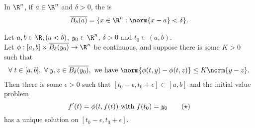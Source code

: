 \begin{definition}
    In $\R^n$, if $a\in \R^n$ and $\delta >0$, the  is
    \begin{align*}
        \overline{B_\delta(a)} = \Set{x\in \R^n}{\norm{x-a} < \delta}.
    \end{align*}
\end{definition}

\begin{theorem} \label{thm:2.15}
    Let $a, b \in \R, (a<b)$, $y_0\in \R^n$, $\delta>0$ and $t_0\in (a,b)$. \\
    Let $\phi: [a,b] \times \overline{B_\delta(y_0)} \to \R^n$ be continuous, and suppose there is some $K>0$ such that
    \begin{align*}
        \forall \; t\in [a,b],\ \forall \; y,z\in \overline{B_\delta(y_0)}, \textup{ we have } \norm{\phi(t,y) - \phi(t,z)} \leq K\norm{y-z}.
    \end{align*}
    Then there is some $\epsilon>0$ such that $[t_0-\epsilon, t_0+\epsilon] \subset [a,b]$ and the initial value problem \[f'(t) =\phi(t,f(t)) \textup{ with } f(t_0) = y_0 \tag{$\star$} \] has a unique solution on $[t_0-\epsilon, t_0+\epsilon]$.
\end{theorem}

